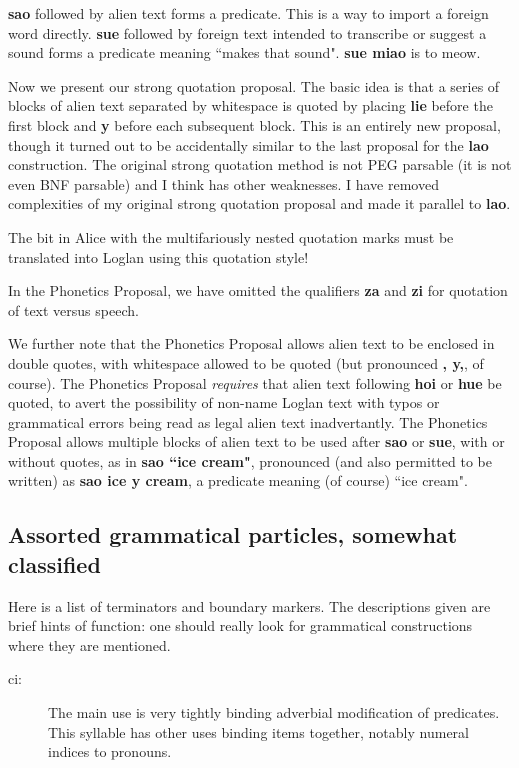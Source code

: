 \documentclass[12pt]{book}
\begin{document}
{{\bf sao} followed by alien text forms a predicate.   This is a way to import a foreign word directly.  {\bf sue} followed by foreign text intended to transcribe or suggest a sound forms a predicate
meaning ``makes that sound".   {\bf sue miao}  is to meow.

Now we present our strong quotation proposal.   The basic idea is that a series of blocks of alien text separated by whitespace is quoted by placing {\bf lie} before the first block
and {\bf y} before each subsequent block. 
This is an entirely new proposal, though it turned out to be accidentally similar to the last proposal for the {\bf lao} construction.  The original strong quotation method is not PEG parsable (it is not even BNF parsable) and I think has other weaknesses.   I have removed complexities of my original strong quotation proposal and made it parallel to {\bf lao}.

The bit in Alice with the multifariously nested quotation marks must be translated into Loglan using this quotation style!

In the Phonetics Proposal, we have omitted the qualifiers {\bf za} and {\bf zi} for quotation of text versus speech.

We further note that the Phonetics Proposal allows alien text to be enclosed in double quotes, with whitespace allowed to be quoted
(but pronounced {\bf, y,}, of course).  The Phonetics Proposal {\em requires\/} that alien text following {\bf hoi} or {\bf hue} be quoted, to avert the possibility of non-name Loglan text with typos or grammatical errors being read as legal alien text inadvertantly.  The Phonetics Proposal allows multiple blocks of alien text to be used after {\bf sao} or {\bf sue}, with or without quotes, as in {\bf sao ``ice cream"}, pronounced (and also permitted to be written)
as {\bf sao ice y cream}, a predicate meaning (of course) ``ice cream".

\subsection{Assorted grammatical particles, somewhat classified}

Here is a list of terminators and boundary markers.  The descriptions given are brief hints of function:  one should really look for grammatical constructions where they are mentioned.

\begin{description}
\item [ci:]  The main use is very tightly binding adverbial modification of predicates.  This syllable has other uses binding items together, notably numeral indices to pronouns.


\end{description}}
\end{document}
